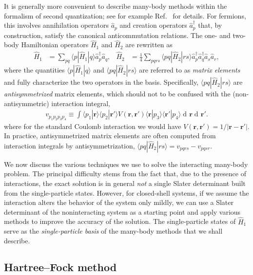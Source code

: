 \documentclass[aip, jcp, 12pt]{revtex4-1}
\newcommand{\D}{\operatorname{d\!}}
\begin{document}
It is generally more convenient to describe many-body methods within the formalism of second quantization; see for example Ref.\ \cite{shavitt2009many} for details.  For fermions, this involves annihilation operators $\hat a_p$ and creation operators $\hat a_p^\dagger$ that, by construction, satisfy the canonical anticommutation relations.  The one- and two-body Hamiltonian operators $\hat{H}_1$ and $\hat{H}_2$ are rewritten as
\begin{align} \label{eq:second_quantized_hamiltonian}
  \hat{H}_1 &= \sum_{p q} \langle p | \hat{H}_1 | q \rangle \hat a_p^\dagger \hat a_q^{}, &
  \hat{H}_2 &= \frac{1}{4} \sum_{p q r s} \langle p q | \hat{H}_2 | r s \rangle \hat a_p^\dagger \hat a_q^\dagger \hat a_s^{} \hat a_r^{},
\end{align}
where the quantities $\langle p | \hat{H}_1 | q \rangle$ and $\langle p q | \hat{H}_2 | r s \rangle$ are referred to as \textit{matrix elements} and fully characterize the two operators in the basis.  Specifically, $\langle p q | \hat{H}_2 | r s \rangle$ are \emph{antisymmetrized} matrix elements, which should not to be confused with the (non-antisymmetric) interaction integral,
\begin{align} \label{eq:interactionintegral}
  v_{p_1 p_2 p_3 p_4} \equiv \int \langle p_1 | \bm{r} \rangle \langle p_2 | \bm{r}'\rangle V(\bm r, \bm r') \langle \bm{r} | p_3 \rangle \langle \bm{r}' | p_4 \rangle \D \bm{r} \D \bm{r}'.
\end{align}
where for the standard Coulomb interaction we would have $V(\bm r, \bm r') = 1 / |\bm r - \bm r'|$.  In practice, antisymmetrized matrix elements are often computed from interaction integrals by antisymmetrization, $\langle p q | \hat{H}_2 | r s \rangle = v_{p q r s} - v_{p q s r}$.

We now discuss the various techniques we use to solve the interacting many-body problem.  The principal difficulty stems from the fact that, due to the presence of interactions, the exact solution is in general \emph{not} a single Slater determinant built from the single-particle states.  However, for closed-shell systems, if we assume the interaction alters the behavior of the system only mildly, we can use a Slater determinant of the noninteracting system as a starting point and apply various methods to improve the accuracy of the solution.  The single-particle states of $\hat{H}_1$ serve as the \textit{single-particle basis} of the many-body methods that we shall describe.

\subsection{Hartree--Fock method}
\label{subsec:HartreeFockmethod}
\end{document}
